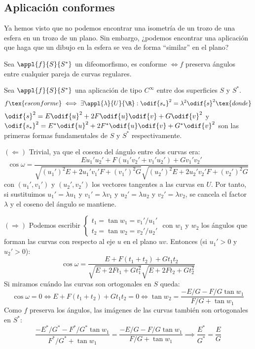 \subsection{Aplicación conformes}

Ya hemos visto que no podemos encontrar una isometría de un trozo de una esfera en un trozo de un plano. Sin embargo, ¿podemos encontrar una aplicación que haga que un dibujo en la esfera se vea de forma ``similar'' en el plano?

\begin{defn}
	Sea $\appl{f}{S}{S^*}$ un difeomorfismo, es conforme $\iff f$ preserva ángulos entre cualquier pareja de curvas regulares.
\end{defn}

\begin{lem}
	Sea $\appl{f}{S}{S^*}$ una aplicación de tipo $C^\infty$ entre dos superficies $S$ y $S^*$.
	\[f \tex{ es conforme} \iff \exists \appl{\lambda}{U}{\R} : \odif{s_*}^2 = \lambda^2 \odif{s}^2 \tex{ donde}\]
	$\odif{s}^2 = E\odif{u}^2 + 2F\odif{u}\odif{v} + G\odif{v}^2$ y $\odif{s_*}^2 = E^*\odif{u}^2 + 2F^*\odif{u}\odif{v} + G^*\odif{v}^2$ son las primeras formas fundamentales de $S$ y $S^*$ respectivamente.
	\begin{dem}
		$(\Longleftarrow)$ Trivial, ya que el coseno del ángulo entre dos curvas era:
		\[\cos\omega = \frac{Eu_1'u_2' + F(u_1'v_2' + v_1'u_2') + Gv_1'v_2'}{\sqrt{(u_1')^2E + 2u_1'v_1'F + (v_1')^2G}\sqrt{(u_2')^2E + 2u_2'v_2'F + (v_2')^2G}}\]
		con $(u_1', v_1')$ y $(u_2', v_2')$ los vectores tangentes a las curvas en $U$. Por tanto, si sustituimos $u_1' = \lambda u_1$ y $v_1' = \lambda v_1$ y $u_2' = \lambda u_2$ y $v_2' = \lambda v_2$, se cancela el factor $\lambda$ y el coseno del ángulo se mantiene.

		$(\Longrightarrow)$ Podemos escribir $\begin{cases}
				t_1 = \tan w_1 = {v_1'}/{u_1'} \\
				t_2 = \tan w_2 = {v_2'}/{u_2'}
			\end{cases}$ con $w_1$ y $w_2$ los ángulos que forman las curvas con respecto al eje $u$ en el plano $uv$. Entonces (si $u_1' >0$ y $u_2' > 0$):
		\[\cos\omega = \frac{E + F(t_1 + t_2) + Gt_1t_2}{\sqrt{E + 2Ft_1 + Gt_1^2}\sqrt{E + 2Ft_2 + Gt_2^2}}\]
		Si miramos cuándo las curvas son ortogonales en $S$ queda:
		\[\cos \omega = 0 \iff E + F(t_1 + t_2) + Gt_1t_2 = 0\iff \tan w_2 = \frac{-E/G -F/G\tan w_1}{F/G + \tan w_1}\]
		Como $f$ preserva los ángulos, las imágenes de las curvas también son ortogonales en $S^*$:
		\[\frac{-E^*/G^* -F^*/G^*\tan w_1}{F^*/G^* + \tan w_1} = \frac{-E/G -F/G\tan w_1}{F/G + \tan w_1} \implies \frac{E^*}{G^*} = \frac{E}{G}\]
	\end{dem}
\end{lem}

